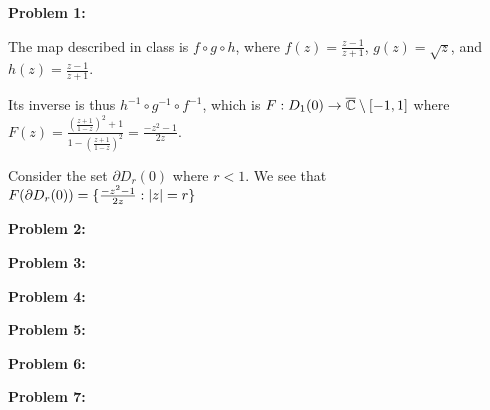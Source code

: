 \documentclass[a4paper,12pt]{article}
\begin{document}
{\bf Problem 1:} %

The map described in class is $f\circ g \circ h$, where $f(z) = \frac{z-1}{z+1}$, $g(z) = \sqrt{z}$, and $h(z) = \frac{z-1}{z+1}$.

Its inverse is thus $h^{-1} \circ g^{-1} \circ f^{-1}$, which is $F: D_1(0) \to \overline{\mathbb{C}} \setminus [-1,1]$ where $F(z) = \frac{\left(\frac{z+1}{1-z}\right)^2 + 1}{1-\left(\frac{z+1}{1-z}\right)^2} = \frac{-z^2-1}{2z}$.

Consider the set $\partial D_r(0)$ where $r < 1$. We see that $F(\partial D_r(0)) = \{\frac{-z^2-1}{2z}: \left\lvert z \right\rvert = r\}$ %

\shunt

{\bf Problem 2:}


\shunt

{\bf Problem 3:}


\shunt

{\bf Problem 4:}

\shunt

{\bf Problem 5:}

\shunt

{\bf Problem 6:}

\shunt

{\bf Problem 7:}

\shunt
\end{document}

